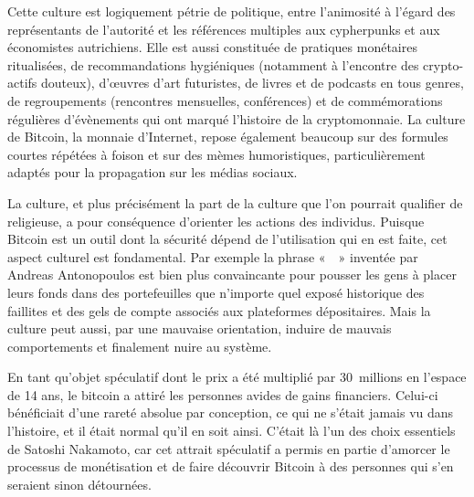 Cette culture est logiquement pétrie de politique, entre l'animosité à l'égard des représentants de l'autorité et les références multiples aux cypherpunks et aux économistes autrichiens. Elle est aussi constituée de pratiques monétaires ritualisées, de recommandations hygiéniques (notamment à l'encontre des crypto-actifs douteux), d'œuvres d'art futuristes, de livres et de podcasts en tous genres, de regroupements (rencontres mensuelles, conférences) et de commémorations régulières d'évènements qui ont marqué l'histoire de la cryptomonnaie. La culture de Bitcoin, la monnaie d'Internet, repose également beaucoup sur des formules courtes répétées à foison et sur des mèmes humoristiques, particulièrement adaptés pour la propagation sur les médias sociaux.

La culture, et plus précisément la part de la culture que l'on pourrait qualifier de religieuse, a pour conséquence d'orienter les actions des individus. Puisque Bitcoin est un outil dont la sécurité dépend de l'utilisation qui en est faite, cet aspect culturel est fondamental. Par exemple la phrase «~~» inventée par Andreas Antonopoulos est bien plus convaincante pour pousser les gens à placer leurs fonds dans des portefeuilles que n'importe quel exposé historique des faillites et des gels de compte associés aux plateformes dépositaires. Mais la culture peut aussi, par une mauvaise orientation, induire de mauvais comportements et finalement nuire au système. %

En tant qu'objet spéculatif dont le prix a été multiplié par 30~millions en l'espace de 14 ans, le bitcoin a attiré les personnes avides de gains financiers. Celui-ci bénéficiait d'une rareté absolue par conception, ce qui ne s'était jamais vu dans l'histoire, et il était normal qu'il en soit ainsi. C'était là l'un des choix essentiels de Satoshi Nakamoto, car cet attrait spéculatif a permis en partie d'amorcer le processus de monétisation et de faire découvrir Bitcoin à des personnes qui s'en seraient sinon détournées.

